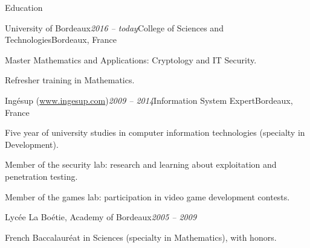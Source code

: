 \begin{rSection}{Education}

  \begin{rSubsection}{University of Bordeaux}{\em 2016 -- today}{College of Sciences and Technologies}{Bordeaux, France}
    \item Master Mathematics and Applications: Cryptology and IT Security.
    \item Refresher training in Mathematics.
  \end{rSubsection}

  \begin{rSubsection}{Ingésup (\href{www.ingesup.com}{www.ingesup.com})}{\em 2009 -- 2014}{Information System Expert}{Bordeaux, France}
    \item[] Five year of university studies in computer information technologies (specialty in Development).
    \item Member of the security lab: research and learning about exploitation and penetration testing.
    \item Member of the games lab: participation in video game development contests.
  \end{rSubsection}

  \begin{rSubsection}{Lycée La Boétie, Academy of Bordeaux}{\em 2005 -- 2009}{}{}
    \item[] French Baccalauréat in Sciences (specialty in Mathematics), with honors.
  \end{rSubsection}

\end{rSection}
